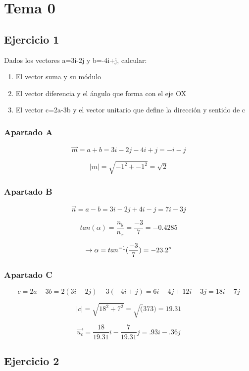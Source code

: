 \section*{Tema 0}

\subsection{Ejercicio 1}

Dados los vectores a=3i-2j y b=-4i+j, calcular:
\begin{enumerate}[label=\Alph*)]
  \item El vector suma y su módulo
  \item El vector diferencia y el ángulo que forma con el eje OX
  \item El vector c=2a-3b y el vector unitario que define
        la dirección y sentido de c
\end{enumerate}

\subsubsection{Apartado A}
  $$
  \overrightarrow{m} = a + b = 3i - 2j - 4i + j = -i-j
  $$

  $$
  \left\lvert m\right\rvert = \sqrt{-1^2 + -1^2} = \sqrt{2}
  $$

\subsubsection{Apartado B}
  $$
  \overrightarrow{n} = a - b = 3i - 2j + 4i - j = 7i-3j
  $$

  $$
  tan(\alpha) = \frac{n_y}{n_x} = \frac{-3}{7} = -0.4285
  $$

  $$
  \rightarrow \alpha = tan^{-1}(\frac{-3}{7}) = -23.2\degree 
  $$

\subsubsection{Apartado C}
  $$
  c = 2a - 3b = 2(3i - 2j) - 3(-4i + j)
  = 6i - 4j + 12i - 3j = 18i -7j
  $$

  $$
  \left\lvert c\right\rvert = \sqrt{18^2 + 7^2} = \sqrt(373)
  = 19.31
  $$

  $$
  \overrightarrow{u_c} = \frac{18}{19.31}i - \frac{7}{19.31}j
  = .93i - .36j
  $$

\subsection{Ejercicio 2}

